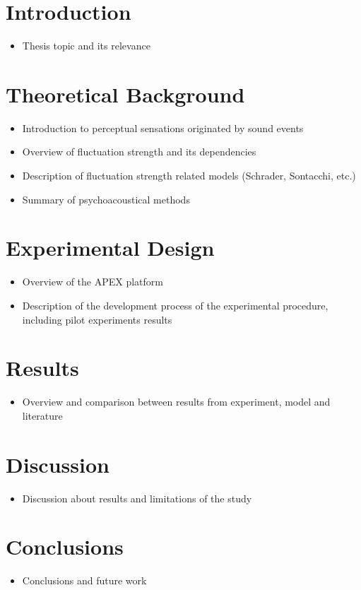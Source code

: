 \documentclass{article}
\begin{document}

\section{Introduction}
\begin{itemize}
  \item Thesis topic and its relevance
\end{itemize}

\section{Theoretical Background}
\begin{itemize}
  \item Introduction to perceptual sensations originated by sound events
  \item Overview of fluctuation strength and its dependencies
  \item Description of fluctuation strength related models (Schrader,
    Sontacchi, etc.)
  \item Summary of psychoacoustical methods
\end{itemize}

\section{Experimental Design}
\begin{itemize}
  \item Overview of the APEX platform
  \item Description of the development process of the experimental procedure,
    including pilot experiments results
\end{itemize}

\section{Results}
\begin{itemize}
  \item Overview and comparison between results from experiment, model and
    literature
\end{itemize}

\section{Discussion}
\begin{itemize}
  \item Discussion about results and limitations of the study
\end{itemize}

\section{Conclusions}
\begin{itemize}
  \item Conclusions and future work
\end{itemize}
\end{document}
